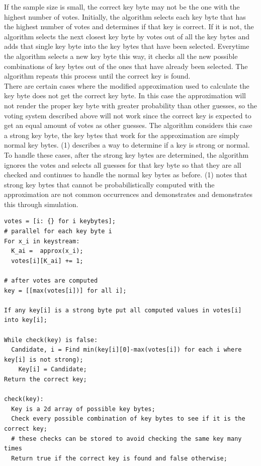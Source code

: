 \documentclass[10pt, titlepage]{article}
\begin{document}
If the sample size is small, the correct key byte may not be the one with the highest number of votes. Initially, the algorithm selects each key byte that has the highest number of votes and determines if that key is correct. If it is not, the algorithm selects the next closest key byte by votes out of all the key bytes and adds that single key byte into the key bytes that have been selected. Everytime the algorithm selects a new key byte this way, it checks all the new possible combinations of key bytes out of the ones that have already been selected. The algorithm repeats this process until the correct key is found. \\

There are certain cases where the modified approximation used to calculate the key byte does not get the correct key byte. In this case the approximation will not render the proper key byte with greater probability than other guesses, so the voting system described above will not work since the correct key is expected to get an equal amount of votes as other guesses. The algorithm considers this case a strong key byte, the key bytes that work for the approximation are simply normal key bytes. (1) describes a way to determine if a key is strong or normal. To handle these cases, after the strong key bytes are determined, the algorithm ignores the votes and selects all guesses for that key byte so that they are all checked and continues to handle the normal key bytes as before. (1) notes that strong key bytes that cannot be probabilistically computed with the approximation are not common occurrences and demonstrates and demonstrates this through simulation.\\

\begin{verbatim}
votes = [i: {} for i keybytes];
# parallel for each key byte i
For x_i in keystream:
  K_ai =  approx(x_i);
  votes[i][K_ai] += 1;

# after votes are computed
key = [[max(votes[i])] for all i];

If any key[i] is a strong byte put all computed values in votes[i] into key[i];

While check(key) is false:
  Candidate, i = Find min(key[i][0]-max(votes[i]) for each i where key[i] is not strong);
    Key[i] = Candidate;
Return the correct key;

check(key):
  Key is a 2d array of possible key bytes;
  Check every possible combination of key bytes to see if it is the correct key;
  # these checks can be stored to avoid checking the same key many times
  Return true if the correct key is found and false otherwise;
\end{verbatim}
\end{document}
